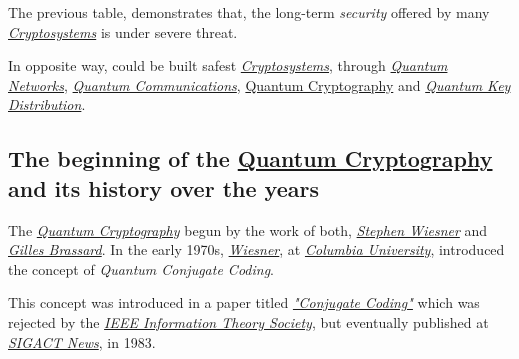 \documentclass[conference]{IEEEtran}
\begin{document}
\vspace{4pt}

The previous table, demonstrates that, the long-term \textit{security} offered by many \href{https://en.wikipedia.org/wiki/Cryptosystem}{\textit{Cryptosystems}} is under severe threat.

\newpage

In opposite way, could be built safest \href{https://en.wikipedia.org/wiki/Cryptosystem}{\textit{Cryptosystems}}, through \href{https://en.wikipedia.org/wiki/Quantum_network}{\textit{Quantum Networks}}, \href{https://en.wikipedia.org/wiki/Quantum_information_science}{\textit{Quantum Communications}}, \href{https://en.wikipedia.org/wiki/Quantum_cryptography}{Quantum Cryptography} and \href{https://en.wikipedia.org/wiki/Quantum_key_distribution}{\textit{Quantum Key Distribution}}.

\vspace{6pt}

\subsection{The beginning of the \href{https://en.wikipedia.org/wiki/Quantum_cryptography}{Quantum Cryptography}\\ and its history over the years}\label{A4}

\vspace{4pt}

The \href{https://en.wikipedia.org/wiki/Quantum_cryptography}{\textit{Quantum Cryptography}} begun by the work of both, \href{https://en.wikipedia.org/wiki/Stephen_Wiesner}{\textit{Stephen Wiesner}} and \href{https://en.wikipedia.org/wiki/Gilles_Brassard}{\textit{Gilles Brassard}}. In the early 1970s, \href{https://en.wikipedia.org/wiki/Stephen_Wiesner}{\textit{Wiesner}}, at \href{https://en.wikipedia.org/wiki/Columbia_University}{\textit{Columbia University}}, introduced the concept of \textit{Quantum Conjugate Coding}.

\vspace{4pt}

This concept was introduced in a paper titled \href{https://dl.acm.org/citation.cfm?id=1008920}{\textit{"Conjugate Coding"}} which was rejected by the \href{https://www.itsoc.org/}{\textit{IEEE Information Theory Society}}, but eventually published at \href{https://www.sigact.org/SIGACT_News/}{\textit{SIGACT News}}, in 1983.

\vspace{4pt}
\end{document}
